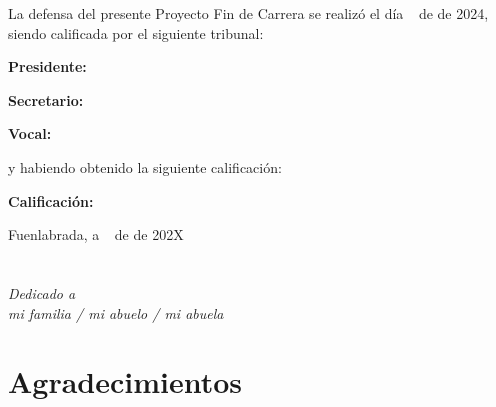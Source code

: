 \documentclass[a4paper, 12pt]{book}
\begin{document}
\vspace{1cm}
La defensa del presente Proyecto Fin de Carrera se realizó el día \qquad$\;\,$ de \qquad\qquad\qquad\qquad \newline de 2024, siendo calificada por el siguiente tribunal:


\vspace{0.5cm}
\textbf{Presidente:}

\vspace{1.2cm}
\textbf{Secretario:}

\vspace{1.2cm}
\textbf{Vocal:}


\vspace{1.2cm}
y habiendo obtenido la siguiente calificación:

\vspace{1cm}
\textbf{Calificación:}


\vspace{1cm}
\begin{flushright}
Fuenlabrada, a \qquad$\;\,$ de \qquad\qquad\qquad\qquad de 202X
\end{flushright}


\chapter*{}
\begin{flushright}
\textit{Dedicado a \\
mi familia / mi abuelo / mi abuela}
\end{flushright}


\chapter*{Agradecimientos}
\end{document}
